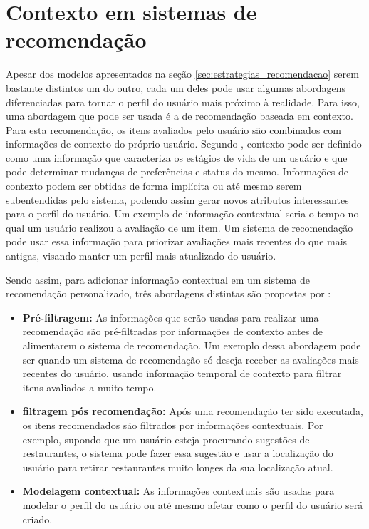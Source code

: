\section{Contexto em sistemas de recomendação}

Apesar dos modelos apresentados na seção \ref{sec:estrategias_recomendacao}
serem bastante distintos um do outro, cada um deles pode usar algumas
abordagens diferenciadas para tornar o perfil do usuário mais próximo à
realidade. Para isso, uma abordagem que pode ser usada é a de recomendação
baseada em contexto. Para esta recomendação, os itens avaliados pelo usuário são
combinados com informações de contexto do próprio usuário. Segundo ,
contexto pode ser definido como uma informação que caracteriza os estágios de
vida de um usuário e que pode determinar mudanças de preferências e status
do mesmo. Informações de contexto podem ser obtidas de forma implícita ou até
mesmo serem subentendidas pelo sistema, podendo assim gerar novos atributos
interessantes para o perfil do usuário. Um exemplo de informação contextual
seria o tempo no qual um usuário realizou a avaliação de um item. Um sistema de
recomendação pode usar essa informação para priorizar avaliações mais recentes
do que mais antigas, visando manter um perfil mais atualizado do usuário.

Sendo assim, para adicionar informação contextual em um sistema de recomendação
personalizado, três abordagens distintas são propostas por
:

\begin{itemize}
    \item \textbf{Pré-filtragem: } As informações que serão usadas
        para realizar uma recomendação são pré-filtradas por informações de
        contexto antes de alimentarem o sistema de recomendação. Um exemplo
        dessa abordagem pode ser quando um sistema de recomendação só deseja
        receber as avaliações mais recentes do usuário, usando informação
        temporal de contexto para filtrar itens avaliados a muito tempo.
    \item \textbf{filtragem pós recomendação: } Após uma recomendação ter sido
        executada, os itens recomendados são filtrados por informações
        contextuais. Por exemplo, supondo que um usuário esteja procurando
        sugestões de restaurantes, o sistema pode fazer essa sugestão e usar a
        localização do usuário para retirar restaurantes muito longes da sua
        localização atual.
    \item \textbf{Modelagem contextual: } As informações contextuais são usadas
        para modelar o perfil do usuário ou até mesmo afetar como o perfil do
        usuário será criado.
\end{itemize}

